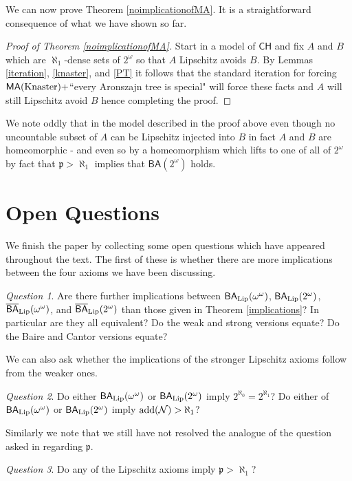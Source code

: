 \documentclass[leqno,11pt]{amsart}
\theoremstyle{definition}
\theoremstyle{remark}
\newtheorem{question}{Question}
\def\Null{\mathcal N}
\def\MA{\mathsf{MA}}
\def\BA{\mathsf{BA}}
\def\baire{\omega^\omega}
\def\cantor{2^\omega}
\def\CH {\mathsf{CH}}
\def\cc{2^{\aleph_0}}
\def\mfp{\mathfrak{p}}
\def\add{{\rm add}}
\begin{document}
We can now prove Theorem \ref{noimplicationofMA}. It is a straightforward consequence of what we have shown so far.

\begin{proof}[Proof of Theorem \ref{noimplicationofMA}]
    Start in a model of $\CH$ and fix $A$ and $B$ which are $\aleph_1$-dense sets of $\cantor$ so that $A$ Lipschitz avoids $B$. By Lemmas \ref{iteration}, \ref{knaster}, and \ref{PT} it follows that the standard iteration for forcing $\MA ({\rm Knaster}) +$``every Aronszajn tree is special" will force these facts and $A$ will still Lipschitz avoid $B$ hence completing the proof. 
\end{proof}

We note oddly that in the model described in the proof above even though no uncountable subset of $A$ can be Lipschitz injected into $B$ in fact $A$ and $B$ are homeomorphic - and even so by a homeomorphism which lifts to one of all of $\cantor$ by fact that $\mfp > \aleph_1$ implies that $\BA (\cantor)$ holds. 

\section{Open Questions}
We finish the paper by collecting some open questions which have appeared throughout the text. The first of these is whether there are more implications between the four axioms we have been discussing.
\begin{question}
    Are there further implications between $\BA_{\rm Lip} (\baire)$, $\BA_{\rm Lip} (\cantor)$, $\overline{\BA}_{\rm Lip} (\baire)$, and $\overline{\BA}_{\rm Lip} (\cantor)$ than those given in Theorem \ref{implications}? In particular are they all equivalent? Do the weak and strong versions equate? Do the Baire and Cantor versions equate?
\end{question}

We can also ask whether the implications of the stronger Lipschitz axioms follow from the weaker ones.
\begin{question}
    Do either $\BA_{\rm Lip} (\baire)$ or $\BA_{\rm Lip} (\cantor)$ imply $\cc = 2^{\aleph_1}$? Do either of $\BA_{\rm Lip} (\baire)$ or $\BA_{\rm Lip} (\cantor)$ imply $\add(\Null) > \aleph_1$?
\end{question}

Similarly we note that we still have not resolved the analogue of the question asked in \cite{Stepranswatson87} regarding $\mfp$. 

\begin{question}
    Do any of the Lipschitz axioms imply $\mfp > \aleph_1$? 
\end{question}
\end{document}
